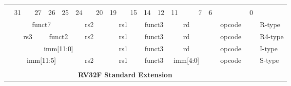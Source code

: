 \begin{table}[p]
\begin{small}
\begin{center}
    \begin{tabular} {p{0.002in}p{0.002in}p{0.002in}p{0.002in}p{0.002in}p{0.002in}p{0.002in}p{0.002in}p{0.002in}p{0.002in}p{0.002in}p{0.002in}p{0.002in}p{0.002in}p{0.002in}p{0.002in}p{0.002in}p{0.002in}p{0.002in}p{0.002in}p{0.002in}p{0.002in}p{0.002in}p{0.002in}p{0.002in}p{0.002in}p{0.002in}p{0.002in}p{0.002in}p{0.002in}p{0.002in}p{0.002in}p{0.002in}l}
    & & & & & & & & & & & & & & & & & & & & & & & & & & & & & & & & \\

            &

    \multicolumn{3}{l}{31} &
    \multicolumn{2}{r}{27} &
    \multicolumn{1}{c}{26} &
    \multicolumn{1}{r}{25} &
    \multicolumn{3}{l}{24} &
    \multicolumn{2}{r}{20} &
    \multicolumn{3}{l}{19} &
    \multicolumn{2}{r}{15} &
    \multicolumn{2}{l}{14} &
    \multicolumn{1}{r}{12} &
    \multicolumn{4}{l}{11} &
    \multicolumn{1}{r}{7} &
    \multicolumn{6}{l}{6} &
    \multicolumn{1}{r}{0} \\
    \cline{2-33}
&


\multicolumn{7}{|c|}{funct7} &
\multicolumn{5}{c|}{rs2} &
\multicolumn{5}{c|}{rs1} &
\multicolumn{3}{c|}{funct3} &
\multicolumn{5}{c|}{rd} &
\multicolumn{7}{|c|}{opcode} & R-type \\
\cline{2-33}
&

\multicolumn{5}{|c|}{rs3} &
\multicolumn{2}{c|}{funct2} &
\multicolumn{5}{c|}{rs2} &
\multicolumn{5}{c|}{rs1} &
\multicolumn{3}{c|}{funct3} &
\multicolumn{5}{c|}{rd} &
\multicolumn{7}{|c|}{opcode} & R4-type \\
\cline{2-33}
&

\multicolumn{12}{|c|}{imm[11:0]} &
\multicolumn{5}{c|}{rs1} &
\multicolumn{3}{c|}{funct3} &
\multicolumn{5}{c|}{rd} &
\multicolumn{7}{|c|}{opcode} & I-type \\
\cline{2-33}
&

\multicolumn{7}{|c|}{imm[11:5]} &
\multicolumn{5}{c|}{rs2} &
\multicolumn{5}{c|}{rs1} &
\multicolumn{3}{c|}{funct3} &
\multicolumn{5}{c|}{imm[4:0]} &
\multicolumn{7}{|c|}{opcode} & S-type \\
\cline{2-33}
&




\multicolumn{32}{c}{} & \\
\multicolumn{32}{c}{\bfseries RV32F Standard Extension } & \\
\cline{2-33}


\end{tabular}
\end{center}
\end{small}
\end{table}
